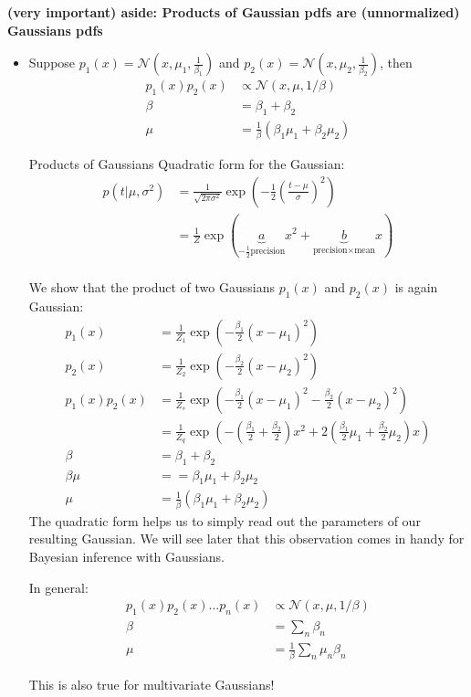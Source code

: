 \textbf{(very important) aside: Products of Gaussian pdfs are (unnormalized) Gaussians pdfs}
\begin{itemize}
\item Suppose $p_1(x)=\mathcal{N}(x,\mu_1, \frac{1}{\beta_1})$ and $ p_2(x)=\mathcal{N}(x,\mu_2, \frac{1}{\beta_2})$, then  
 \begin{align}
p_1(x) p_2(x) &\propto \mathcal{N}(x, \mu, 1/\beta)\\
\beta&=\beta_1+\beta_2\\
\mu&=\frac{1}{\beta}(\beta_1 \mu_1 +  \beta_2 \mu_2)
\end{align}

\begin{bbbox}{Products of Gaussians}
	Quadratic form for the Gaussian:
	\begin{align*}
		p(t|\mu, \sigma^2) 
		&=\frac{1}{\sqrt{2\pi\sigma^2}}\exp\left( -\frac{1}{2}\left(\frac{t-\mu}{\sigma} \right)^2\right) \\
		&= \frac{1}{Z} \exp \left( \underbrace{a}_{-\frac{1}{2}\text{precision}}x^2 + \underbrace{b}_{\text{precision} \times \text{mean}}x \right) \\
	\end{align*}
	
	We show that the product of two Gaussians $p_1(x)$ and $p_2(x)$ is again Gaussian: \\
	\begin{align*}
	p_1(x) &= \frac{1}{Z_1} \exp \left( -\frac{\beta_1}{2} \left(x-\mu_1 \right)^2 \right) 	\\
	p_2(x) &= \frac{1}{Z_2} \exp \left( -\frac{\beta_2}{2} \left(x-\mu_2 \right)^2 \right) 	\\
	p_1(x) p_2(x) &= \frac{1}{Z_s} \exp \left( -\frac{\beta_1}{2} \left( x - \mu_1 \right)^2
					  -\frac{\beta_2}{2} \left( x - \mu_2 \right)^2	\right)\\
				  &= \frac{1}{Z_q} \exp \left( -\left( \frac{\beta_1}{2} + \frac{\beta_2}{2}\right) x^2
	                 + 2\left( \frac{\beta_1}{2} \mu_1 + \frac{\beta_2}{2} \mu_2 \right) x \right)\\
	\beta &= \beta_1 + \beta_2 \\
	\beta \mu &= = \beta_1 \mu_1 + \beta_2 \mu_2 \\
	\mu &= \frac{1}{\beta} \left( \beta_1 \mu_1 + \beta_2 \mu_2 \right)
	\end{align*}
	The quadratic form helps us to simply read out the parameters of our resulting Gaussian. We will see later that this observation comes in handy for Bayesian inference with Gaussians.
\end{bbbox}
 
In general:
\begin{align}
p_1(x) p_2(x) ... p_n(x) &\propto \mathcal{N}(x, \mu, 1/\beta)\\
\beta&=\sum_n \beta_n\\
\mu&=\frac{1}{\beta} \sum_n \mu_n \beta_n
\end{align}

 
This is also true for multivariate Gaussians!

\end{itemize}



